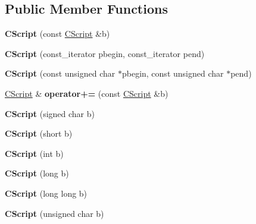 \subsection*{Public Member Functions}
\begin{DoxyCompactItemize}
\item 
\mbox{\label{class_c_script_a32037617a2648c826f3685d17a46d6cf}} 
{\bfseries C\+Script} (const \mbox{\hyperlink{class_c_script}{C\+Script}} \&b)
\item 
\mbox{\label{class_c_script_a06a47661695214630a2f41d4019b20f5}} 
{\bfseries C\+Script} (const\+\_\+iterator pbegin, const\+\_\+iterator pend)
\item 
\mbox{\label{class_c_script_aa8d9ad6ecd9662b423b73294783396ce}} 
{\bfseries C\+Script} (const unsigned char $\ast$pbegin, const unsigned char $\ast$pend)
\item 
\mbox{\label{class_c_script_af5c72a9c725a2c4f1432cc214d54cfd7}} 
\mbox{\hyperlink{class_c_script}{C\+Script}} \& {\bfseries operator+=} (const \mbox{\hyperlink{class_c_script}{C\+Script}} \&b)
\item 
\mbox{\label{class_c_script_a56509326653f847006c21c70938cb896}} 
{\bfseries C\+Script} (signed char b)
\item 
\mbox{\label{class_c_script_ad9275154073efebbeb1da8a81f1ad981}} 
{\bfseries C\+Script} (short b)
\item 
\mbox{\label{class_c_script_ac0fdbf14458c5c33713a51582cdf1507}} 
{\bfseries C\+Script} (int b)
\item 
\mbox{\label{class_c_script_a41d7433a08d75a1cd9f7cd449d07341c}} 
{\bfseries C\+Script} (long b)
\item 
\mbox{\label{class_c_script_a2d77d733e711257c7481117b5dfb9945}} 
{\bfseries C\+Script} (long long b)
\item 
\mbox{\label{class_c_script_ae1842fefe5cb1e9a8dd5b1fa6db12741}} 
{\bfseries C\+Script} (unsigned char b)
\item 

\end{DoxyCompactItemize}
